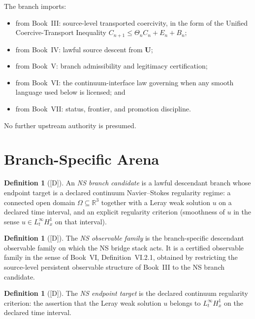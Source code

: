 \documentclass[12pt,oneside]{amsbook}
\theoremstyle{plain}
\theoremstyle{definition}
\newtheorem{definition}[theorem]{Definition}
\theoremstyle{remark}
\newcommand{\status}[1]{\textup{[#1]}}
\begin{document}
The branch imports:
\begin{itemize}
 \item from Book~III: source-level transported coercivity, in the
 form of the Unified Coercive-Transport Inequality
 $C_{n+1} \leq \Theta_n C_n + E_n + B_n$;
 \item from Book~IV: lawful source descent from $\mathbf{U}$;
 \item from Book~V: branch admissibility and legitimacy
 certification;
 \item from Book~VI: the continuum-interface law governing when
 any smooth language used below is licensed; and
 \item from Book~VII: status, frontier, and promotion discipline.
\end{itemize}

No further upstream authority is presumed.

\section{Branch-Specific Arena}
\label{sec:arena}

\begin{definition}[\status{D}]\label{def:NS-candidate}
An \emph{NS branch candidate} is a lawful descendant branch
whose endpoint target is a declared continuum Navier--Stokes
regularity regime: a connected open domain $\Omega \subseteq
\mathbb{R}^3$ together with a Leray weak solution $u$ on a
declared time interval, and an explicit regularity criterion
(smoothness of $u$ in the sense $u \in L^\infty_t H^1_x$ on
that interval).
\end{definition}

\begin{definition}[\status{D}]\label{def:NS-observable-family}
The \emph{NS observable family} is the branch-specific
descendant observable family on which the NS bridge stack acts.
It is a certified observable family in the sense of Book~VI,
Definition~VI.2.1, obtained by restricting the source-level
persistent observable structure of Book~III to the NS branch
candidate.
\end{definition}

\begin{definition}[\status{D}]\label{def:NS-endpoint}
The \emph{NS endpoint target} is the declared continuum
regularity criterion: the assertion that the Leray weak solution
$u$ belongs to $L^\infty_t H^1_x$ on the declared time
interval.
\end{definition}
\end{document}
